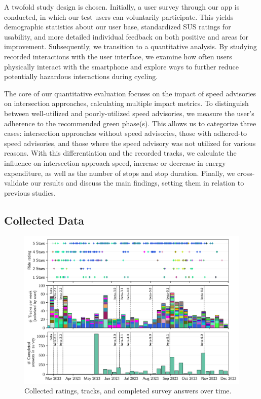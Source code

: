 A twofold study design is chosen. Initially, a user survey through our app is conducted, in which our test users can voluntarily participate. This yields demographic statistics about our user base, standardized SUS ratings for usability, and more detailed individual feedback on both positive and areas for improvement. Subsequently, we transition to a quantitative analysis. By studying recorded interactions with the user interface, we examine how often users physically interact with the smartphone and explore ways to further reduce potentially hazardous interactions during cycling.

The core of our quantitative evaluation focuses on the impact of speed advisories on intersection approaches, calculating multiple impact metrics. To distinguish between well-utilized and poorly-utilized speed advisories, we measure the user's adherence to the recommended green phase(s). This allows us to categorize three cases: intersection approaches without speed advisories, those with adhered-to speed advisories, and those where the speed advisory was not utilized for various reasons. With this differentiation and the recorded tracks, we calculate the influence on intersection approach speed, increase or decrease in energy expenditure, as well as the number of stops and stop duration. Finally, we cross-validate our results and discuss the main findings, setting them in relation to previous studies.

\subsection{Collected Data}

\begin{figure}[t]
\caption{Collected ratings, tracks, and completed survey answers over time.}\label{fig:app-usage-over-time}
\includegraphics[width=\linewidth]{images/app-usage-over-time.pdf}
\end{figure}

